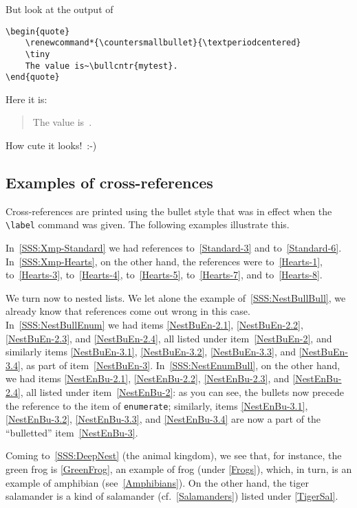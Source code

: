 \documentclass[a4paper]{article}
\DeclareRobustCommand*{\env}[1]{\texttt{#1}}
\newcommand*{\Enumerat}{enumerate}
\newcommand*{\enenv}{\env{\Enumerat}}
\begin{document}
But look at the output of
%
\begin{verbatim}
\begin{quote}
    \renewcommand*{\countersmallbullet}{\textperiodcentered}
    \tiny
    The value is~\bullcntr{mytest}.
\end{quote}
\end{verbatim}
%
Here it is:
%
\begin{quote}
    \renewcommand*{\countersmallbullet}{\textperiodcentered}
    \tiny
    The value is~.
\end{quote}
%
How cute it looks!~:-)



\subsection{Examples of cross-references}
\label{SS:CrossXmp}

Cross-references are printed using the bullet style that was in
effect when the \verb|\label| command was given.  The following
examples illustrate this.

In~\ref{SSS:Xmp-Standard} we had references to~\ref{Standard-3} and
to~\ref{Standard-6}.  In~\ref{SSS:Xmp-Hearts}, on the other hand, the
references were to~\ref{Hearts-1}, to~\ref{Hearts-3},
to~\ref{Hearts-4}, to~\ref{Hearts-5}, to~\ref{Hearts-7}, and
to~\ref{Hearts-8}.

We turn now to nested lists.  We let alone the example
of~\ref{SSS:NestBullBull}, we already know that references come out
wrong in this case.  In~\ref{SSS:NestBullEnum} we had items
\ref{NestBuEn-2.1}, \ref{NestBuEn-2.2}, \ref{NestBuEn-2.3}, and
\ref{NestBuEn-2.4}, all listed under item~\ref{NestBuEn-2}, and
similarly items \ref{NestBuEn-3.1}, \ref{NestBuEn-3.2},
\ref{NestBuEn-3.3}, and \ref{NestBuEn-3.4}, as part of
item~\ref{NestBuEn-3}.  In~\ref{SSS:NestEnumBull}, on the other hand,
we had items \ref{NestEnBu-2.1}, \ref{NestEnBu-2.2},
\ref{NestEnBu-2.3}, and \ref{NestEnBu-2.4}, all listed under
item~\ref{NestEnBu-2}: as you can see, the bullets now precede the
reference to the item of \enenv; similarly, items \ref{NestEnBu-3.1},
\ref{NestEnBu-3.2}, \ref{NestEnBu-3.3}, and \ref{NestEnBu-3.4} are now
a part of the ``bulletted'' item~\ref{NestEnBu-3}.

Coming to~\ref{SSS:DeepNest} (the animal kingdom), we see that, for
instance, the green frog is \ref{GreenFrog}, an example of frog (under
\ref{Frogs}), which, in turn, is an example of amphibian
(see~\ref{Amphibians}).  On the other hand, the tiger salamander is a
kind of salamander (cf.~\ref{Salamanders}) listed under
\ref{TigerSal}.
\end{document}
